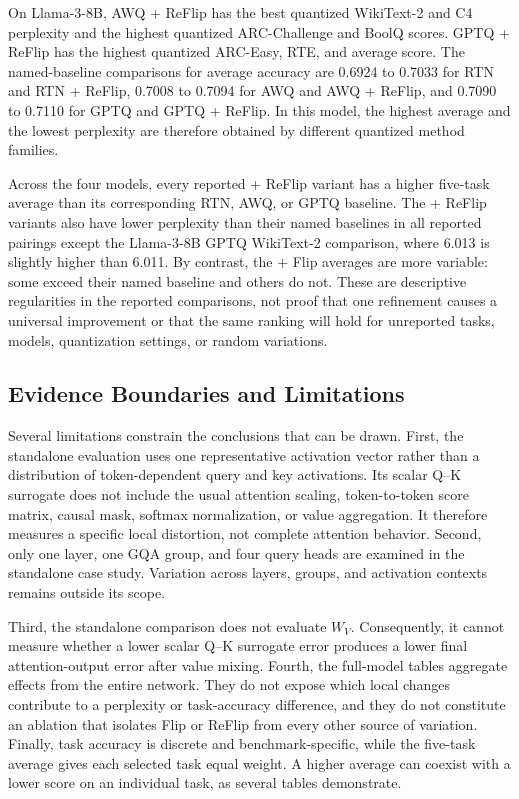 \documentclass[../main.tex]{subfiles}
\begin{document}
On Llama-3-8B, AWQ + ReFlip has the best quantized WikiText-2 and C4 perplexity and the highest quantized ARC-Challenge and BoolQ scores. GPTQ + ReFlip has the highest quantized ARC-Easy, RTE, and average score. The named-baseline comparisons for average accuracy are 0.6924 to 0.7033 for RTN and RTN + ReFlip, 0.7008 to 0.7094 for AWQ and AWQ + ReFlip, and 0.7090 to 0.7110 for GPTQ and GPTQ + ReFlip. In this model, the highest average and the lowest perplexity are therefore obtained by different quantized method families.

Across the four models, every reported + ReFlip variant has a higher five-task average than its corresponding RTN, AWQ, or GPTQ baseline. The + ReFlip variants also have lower perplexity than their named baselines in all reported pairings except the Llama-3-8B GPTQ WikiText-2 comparison, where 6.013 is slightly higher than 6.011. By contrast, the + Flip averages are more variable: some exceed their named baseline and others do not. These are descriptive regularities in the reported comparisons, not proof that one refinement causes a universal improvement or that the same ranking will hold for unreported tasks, models, quantization settings, or random variations.

\subsection{Evidence Boundaries and Limitations}

Several limitations constrain the conclusions that can be drawn. First, the standalone evaluation uses one representative activation vector rather than a distribution of token-dependent query and key activations. Its scalar Q--K surrogate does not include the usual attention scaling, token-to-token score matrix, causal mask, softmax normalization, or value aggregation. It therefore measures a specific local distortion, not complete attention behavior. Second, only one layer, one GQA group, and four query heads are examined in the standalone case study. Variation across layers, groups, and activation contexts remains outside its scope.

Third, the standalone comparison does not evaluate $W_V$. Consequently, it cannot measure whether a lower scalar Q--K surrogate error produces a lower final attention-output error after value mixing. Fourth, the full-model tables aggregate effects from the entire network. They do not expose which local changes contribute to a perplexity or task-accuracy difference, and they do not constitute an ablation that isolates Flip or ReFlip from every other source of variation. Finally, task accuracy is discrete and benchmark-specific, while the five-task average gives each selected task equal weight. A higher average can coexist with a lower score on an individual task, as several tables demonstrate.
\end{document}
